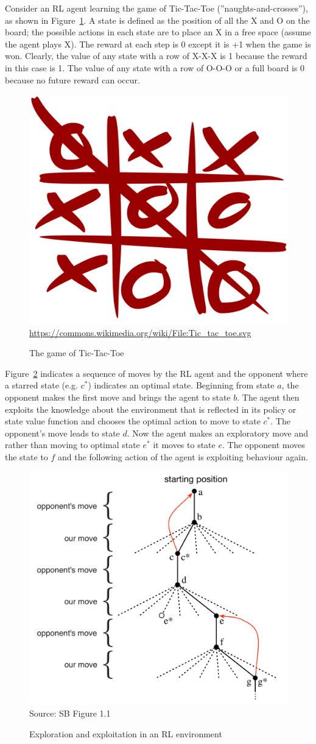 Consider an RL agent learning the game of Tic-Tac-Toe (''naughts-and-crosses''), as shown in Figure~\ref{fig:tictactoe}. A state is defined as the position of all the X and O on the board; the possible actions in each state are to place an X in a free space (assume the agent plays X). The reward at each step is 0 except it is +1 when the game is won. Clearly, the value of any state with a row of X-X-X is 1 because the reward in this case is 1. The value of any state with a row of O-O-O or a full board is 0 because no future reward can occur. 

\begin{figure}
\centering
\includegraphics[width=.25\textwidth]{Tic_tac_toe.png} \\
\vspace{\baselineskip}
\scriptsize \url{https://commons.wikimedia.org/wiki/File:Tic_tac_toe.svg}
\caption{The game of Tic-Tac-Toe}
\label{fig:tictactoe}
\end{figure}

Figure~\ref{fig:screen1_chap21} indicates a sequence of moves by the RL agent and the opponent where a starred state (e.g. $c^*$) indicates an optimal state. Beginning from state $a$, the opponent makes the first move and brings the agent to state $b$. The agent then exploits the knowledge about the environment that is reflected in its policy or state value function and chooses the optimal action to move to state $c^*$. The opponent's move leads to state $d$. Now the agent makes an exploratory move and rather than moving to optimal state $e^*$ it moves to state $e$. The opponent moves the state to $f$ and the following action of the agent is exploiting behaviour again. 


\begin{figure}
\centering
\includegraphics[width=.75\textwidth]{screen1.png} \\
\centering
\scriptsize Source: SB Figure 1.1
\caption{Exploration and exploitation in an RL environment}
\label{fig:screen1_chap21}
\end{figure}

